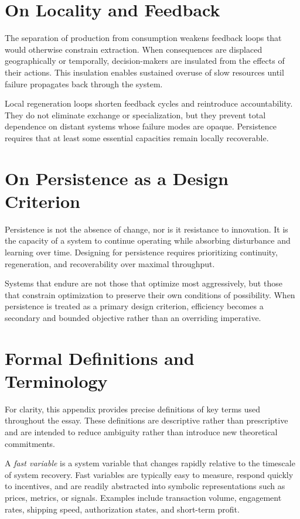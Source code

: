\documentclass[12pt]{article} \usepackage[margin=1in]{geometry} \usepackage{setspace} \usepackage{amsmath,amssymb} \usepackage{hyperref}
\begin{document}
\section{On Locality and Feedback}

The separation of production from consumption weakens feedback loops that would otherwise constrain extraction. When consequences are displaced geographically or temporally, decision-makers are insulated from the effects of their actions. This insulation enables sustained overuse of slow resources until failure propagates back through the system.

Local regeneration loops shorten feedback cycles and reintroduce accountability. They do not eliminate exchange or specialization, but they prevent total dependence on distant systems whose failure modes are opaque. Persistence requires that at least some essential capacities remain locally recoverable.

\section{On Persistence as a Design Criterion}

Persistence is not the absence of change, nor is it resistance to innovation. It is the capacity of a system to continue operating while absorbing disturbance and learning over time. Designing for persistence requires prioritizing continuity, regeneration, and recoverability over maximal throughput.

Systems that endure are not those that optimize most aggressively, but those that constrain optimization to preserve their own conditions of possibility. When persistence is treated as a primary design criterion, efficiency becomes a secondary and bounded objective rather than an overriding imperative.

\section{Formal Definitions and Terminology}

For clarity, this appendix provides precise definitions of key terms used throughout the essay. These definitions are descriptive rather than prescriptive and are intended to reduce ambiguity rather than introduce new theoretical commitments.

A \emph{fast variable} is a system variable that changes rapidly relative to the timescale of system recovery. Fast variables are typically easy to measure, respond quickly to incentives, and are readily abstracted into symbolic representations such as prices, metrics, or signals. Examples include transaction volume, engagement rates, shipping speed, authorization states, and short-term profit.
\end{document}
